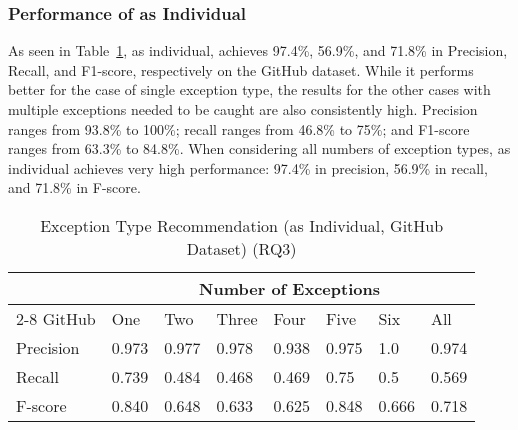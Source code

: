 

\subsubsection{Performance of {\xtype} as Individual}
As seen in Table~\ref{tab:xtype-1}, as individual, {\xtype} achieves
97.4\%, 56.9\%, and 71.8\% in Precision, Recall, and F1-score,
respectively on the GitHub dataset. While it performs better for the
case of single exception type, the results for the other cases with
multiple exceptions needed to be caught are also consistently high.
Precision ranges from 93.8\% to 100\%; recall ranges from 46.8\% to
75\%; and F1-score ranges from 63.3\% to 84.8\%. When considering all
numbers of exception types, {\xtype} as individual achieves very high
performance: 97.4\% in precision, 56.9\% in recall, and 71.8\% in
F-score.

\begin{table}[htpb]
  \caption{Exception Type Recommendation (\xtype as Individual, GitHub Dataset) (RQ3)}
  \vspace{-12pt}
  \small
	\begin{center}
		\renewcommand{\arraystretch}{1}
		\begin{tabular}{| p{1.2cm}<{\centering} | p{0.6cm}<{\centering} | p{0.6cm}<{\centering}| p{0.6cm}<{\centering} | p{0.6cm}<{\centering} | p{0.6cm}<{\centering} | p{0.6cm}<{\centering} | p{0.6cm}<{\centering} |}
		  \hline
			\multirow{2}{*}{} & \multicolumn{7}{c|}{Number of Exceptions} \\
			\cline{2-8}
			GitHub & One & Two & Three & Four & Five & Six & All\\
			\hline
			Precision &  0.973 & 0.977 & 0.978 & 0.938 & 0.975 & 1.0 & 0.974\\
			\hline
			Recall &  0.739 & 0.484 & 0.468 & 0.469 & 0.75 & 0.5 & 0.569\\
			\hline
			F-score &  0.840 & 0.648 & 0.633 & 0.625 & 0.848 & 0.666 & 0.718\\
			\hline
		\end{tabular}
		\label{tab:xtype-1}
	\end{center}
\end{table}
